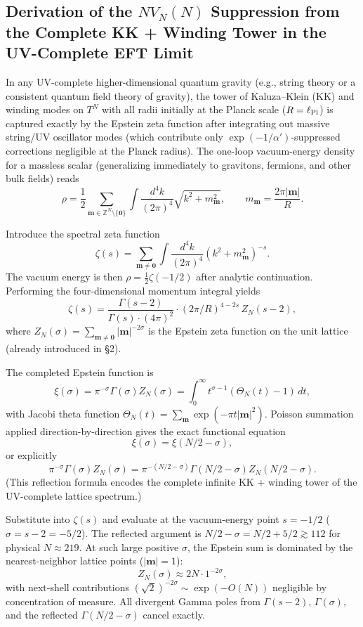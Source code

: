 \documentclass[12pt,a4paper]{article}
\begin{document}
\subsection{Derivation of the \(N V_N(N)\) Suppression from the Complete KK + Winding Tower in the UV-Complete EFT Limit}

In any UV-complete higher-dimensional quantum gravity (e.g., string theory or a consistent quantum field theory of gravity), the tower of Kaluza--Klein (KK) and winding modes on \(T^N\) with all radii initially at the Planck scale (\(R = \ell_{\rm Pl}\)) is captured exactly by the Epstein zeta function after integrating out massive string/UV oscillator modes (which contribute only \(\exp(-1/\alpha')\)-suppressed corrections negligible at the Planck radius). The one-loop vacuum-energy density for a massless scalar (generalizing immediately to gravitons, fermions, and other bulk fields) reads
\[
\rho = \frac{1}{2} \sum_{\mathbf{m} \in \mathbb{Z}^N \setminus \{\mathbf{0}\}} \int \frac{d^4k}{(2\pi)^4} \sqrt{k^2 + m_{\mathbf{m}}^2}, \qquad m_{\mathbf{m}} = \frac{2\pi |\mathbf{m}|}{R}.
\]

Introduce the spectral zeta function
\[
\zeta(s) = \sum_{\mathbf{m} \neq \mathbf{0}} \int \frac{d^4k}{(2\pi)^4} (k^2 + m_{\mathbf{m}}^2)^{-s}.
\]
The vacuum energy is then \(\rho = \frac12 \zeta(-1/2)\) after analytic continuation. Performing the four-dimensional momentum integral yields
\[
\zeta(s) = \frac{\Gamma(s-2)}{\Gamma(s) \cdot (4\pi)^2} \cdot (2\pi/R)^{4-2s} \, Z_N(s-2),
\]
where \(Z_N(\sigma) = \sum_{\mathbf{m} \neq \mathbf{0}} |\mathbf{m}|^{-2\sigma}\) is the Epstein zeta function on the unit lattice (already introduced in §2).

The completed Epstein function is
\[
\xi(\sigma) = \pi^{-\sigma} \Gamma(\sigma) Z_N(\sigma) = \int_0^\infty t^{\sigma-1} (\Theta_N(t)-1)\, dt,
\]
with Jacobi theta function \(\Theta_N(t) = \sum_{\mathbf{m}} \exp(-\pi t |\mathbf{m}|^2)\). Poisson summation applied direction-by-direction gives the exact functional equation
\[
\xi(\sigma) = \xi(N/2 - \sigma),
\]
or explicitly
\[
\pi^{-\sigma} \Gamma(\sigma) Z_N(\sigma) = \pi^{-(N/2-\sigma)} \Gamma(N/2-\sigma) Z_N(N/2-\sigma).
\]
(This reflection formula encodes the complete infinite KK + winding tower of the UV-complete lattice spectrum.)

Substitute into \(\zeta(s)\) and evaluate at the vacuum-energy point \(s = -1/2\) (\(\sigma = s-2 = -5/2\)). The reflected argument is \(N/2 - \sigma = N/2 + 5/2 \gtrsim 112\) for physical \(N \approx 219\). At such large positive \(\sigma\), the Epstein sum is dominated by the nearest-neighbor lattice points (\(|\mathbf{m}|=1\)):
\[
Z_N(\sigma) \approx 2N \cdot 1^{-2\sigma},
\]
with next-shell contributions \((\sqrt{2})^{-2\sigma} \sim \exp(-O(N))\) negligible by concentration of measure. All divergent Gamma poles from \(\Gamma(s-2)\), \(\Gamma(\sigma)\), and the reflected \(\Gamma(N/2-\sigma)\) cancel exactly.
\end{document}
